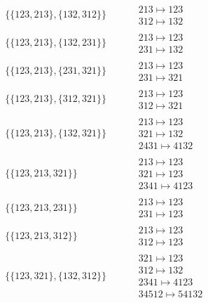 \begin{tiny}
\begin{align}
\begin{matrix}
\end{matrix}
\\
\{\{123, 213\}, \{132, 312\}\}
\quad
&
\phantom{.}
&
\begin{matrix}
213 \mapsto 123\\312 \mapsto 132
\end{matrix}
\\
\{\{123, 213\}, \{132, 231\}\}
\quad
&
\phantom{.}
&
\begin{matrix}
213 \mapsto 123\\231 \mapsto 132
\end{matrix}
\\
\{\{123, 213\}, \{231, 321\}\}
\quad
&
\phantom{.}
&
\begin{matrix}
213 \mapsto 123\\231 \mapsto 321
\end{matrix}
\\
\{\{123, 213\}, \{312, 321\}\}
\quad
&
\phantom{.}
&
\begin{matrix}
213 \mapsto 123\\312 \mapsto 321
\end{matrix}
\\
\{\{123, 213\}, \{132, 321\}\}
\quad
&
\phantom{.}
&
\begin{matrix}
213 \mapsto 123\\321 \mapsto 132\\2431 \mapsto 4132
\end{matrix}
\\
\{\{123, 213, 321\}\}
\quad
&
\phantom{.}
&
\begin{matrix}
213 \mapsto 123\\321 \mapsto 123\\2341 \mapsto 4123
\end{matrix}
\\
\{\{123, 213, 231\}\}
\quad
&
\phantom{.}
&
\begin{matrix}
213 \mapsto 123\\231 \mapsto 123
\end{matrix}
\\
\{\{123, 213, 312\}\}
\quad
&
\phantom{.}
&
\begin{matrix}
213 \mapsto 123\\312 \mapsto 123
\end{matrix}
\\
\{\{123, 321\}, \{132, 312\}\}
\quad
&
\phantom{.}
&
\begin{matrix}
321 \mapsto 123\\312 \mapsto 132\\2341 \mapsto 4123\\34512 \mapsto 54132

\end{matrix}
\end{align}
\end{tiny}
